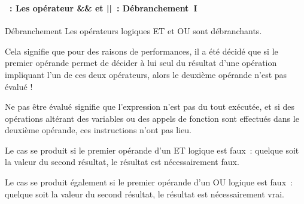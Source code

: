 \begin{frame}[containsverbatim]
  \frametitle{\secname}
  \framesubtitle{\subsecname~: Les opérateur \&\& et ||~: Débranchement~I} 

  {\small\begin{alertblock}{Débranchement}
    Les opérateurs logiques ET et OU sont débranchants.
    \par
    Cela signifie que pour des raisons de performances, il a été décidé que si le premier opérande permet de décider à lui seul du résultat d'une
    opération impliquant l'un de ces deux opérateurs, alors le deuxième opérande n'est pas évalué !
    \vspace{0.3cm}
    \par
    Ne pas être évalué signifie que l'expression n'est pas du tout exécutée, et si des opérations altérant des variables ou des appels de fonction
    sont effectués dans le deuxième opérande, ces instructions n'ont pas lieu.
    \vspace{0.3cm}
    \par
    Le cas se produit si le premier opérande d'un ET logique est faux~: quelque soit la valeur du second résultat, le résultat est nécessairement
    faux.
    \par
    Le cas se produit également si le premier opérande d'un OU logique est faux~: quelque soit la valeur du second résultat, le résultat est
    nécessairement vrai.
  \end{alertblock}}
\end{frame}

